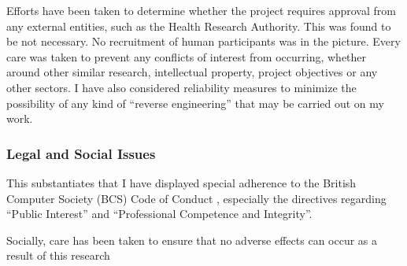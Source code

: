 \vspace{5pt}
\noindent Efforts have been taken to determine whether the project requires approval from any external entities, such as the Health Research Authority\cite{hraPlanning}. This was found to be not necessary. No recruitment of human participants was in the picture. Every care was taken to prevent any conflicts of interest from occurring, whether around other similar research, intellectual property, project objectives or any other sectors. I have also considered reliability measures to minimize the possibility of any kind of “reverse engineering” that may be carried out on my work. 

\subsubsection{Legal and Social Issues}
\noindent This substantiates that I have displayed special adherence to the British Computer Society (BCS) Code of Conduct \cite{bcsCodeConduct}, especially the directives regarding “Public Interest” and “Professional Competence and Integrity”.

Socially, care has been taken to ensure that no adverse effects can occur as a result of this research















